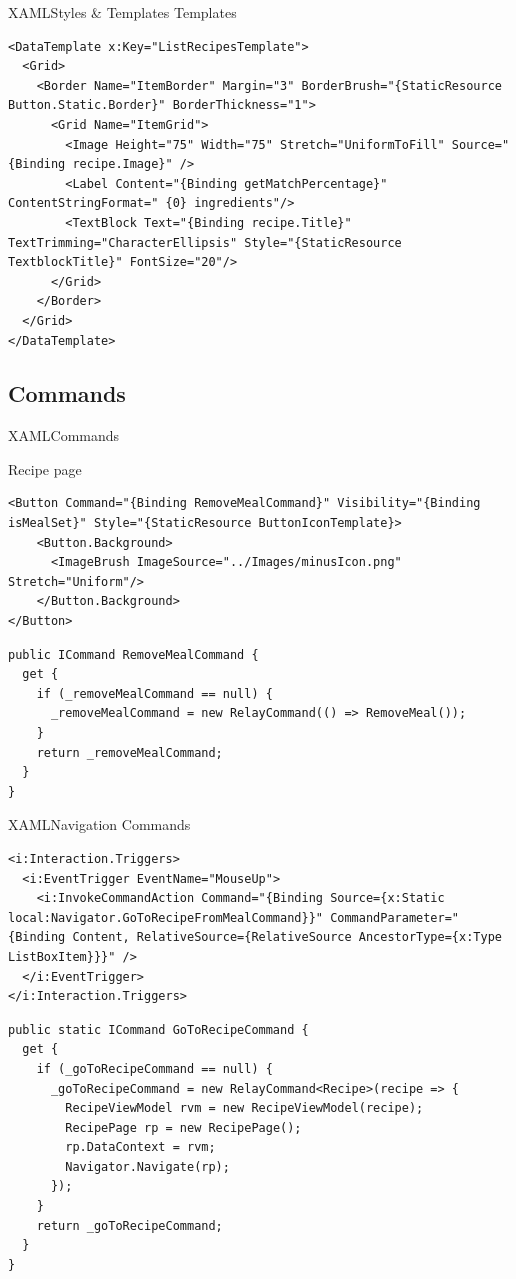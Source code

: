 \begin{frame}[fragile]{XAML}{Styles \& Templates}
Templates
\begin{lstlisting}
<DataTemplate x:Key="ListRecipesTemplate">
  <Grid>
    <Border Name="ItemBorder" Margin="3" BorderBrush="{StaticResource Button.Static.Border}" BorderThickness="1">
      <Grid Name="ItemGrid">
        <Image Height="75" Width="75" Stretch="UniformToFill" Source="{Binding recipe.Image}" />
        <Label Content="{Binding getMatchPercentage}" ContentStringFormat=" {0} ingredients"/>
        <TextBlock Text="{Binding recipe.Title}" TextTrimming="CharacterEllipsis" Style="{StaticResource TextblockTitle}" FontSize="20"/>
      </Grid>
    </Border>
  </Grid>
</DataTemplate>
\end{lstlisting}
\end{frame}

\subsection{Commands} 
\begin{frame}[fragile]{XAML}{Commands}

Recipe page
\begin{lstlisting}
<Button Command="{Binding RemoveMealCommand}" Visibility="{Binding isMealSet}" Style="{StaticResource ButtonIconTemplate}>
    <Button.Background>
      <ImageBrush ImageSource="../Images/minusIcon.png" Stretch="Uniform"/>
    </Button.Background>
</Button>
\end{lstlisting}

\begin{lstlisting}
public ICommand RemoveMealCommand {
  get {
    if (_removeMealCommand == null) {
      _removeMealCommand = new RelayCommand(() => RemoveMeal());
    }
    return _removeMealCommand;
  }
}
\end{lstlisting}
\end{frame}

\begin{frame}[fragile]{XAML}{Navigation Commands}
\begin{lstlisting}
<i:Interaction.Triggers>
  <i:EventTrigger EventName="MouseUp">
    <i:InvokeCommandAction Command="{Binding Source={x:Static local:Navigator.GoToRecipeFromMealCommand}}" CommandParameter="{Binding Content, RelativeSource={RelativeSource AncestorType={x:Type ListBoxItem}}}" />
  </i:EventTrigger>
</i:Interaction.Triggers>
\end{lstlisting}

\begin{lstlisting}
public static ICommand GoToRecipeCommand {
  get {
    if (_goToRecipeCommand == null) {
      _goToRecipeCommand = new RelayCommand<Recipe>(recipe => {
        RecipeViewModel rvm = new RecipeViewModel(recipe);
        RecipePage rp = new RecipePage();
        rp.DataContext = rvm;
        Navigator.Navigate(rp);
      });
    }
    return _goToRecipeCommand;
  }
}
\end{lstlisting}
\end{frame}
